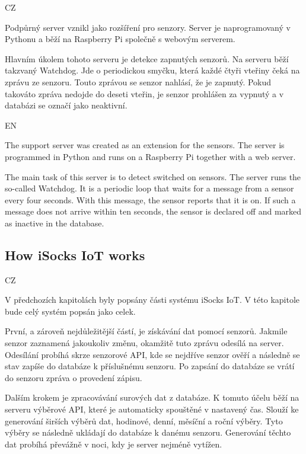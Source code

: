 \documentclass[12pt, a4paper]{article}
\begin{document}
CZ

Podpůrný server vznikl jako rozšíření pro senzory.
Server je naprogramovaný v Pythonu a běží na Raspberry Pi společně s webovým serverem.\newline

Hlavním úkolem tohoto serveru je detekce zapnutých senzorů.
Na serveru běží takzvaný Watchdog.
Jde o periodickou smyčku, která každé čtyři vteřiny čeká na zprávu ze senzoru.
Touto zprávou se senzor nahlásí, že je zapnutý. Pokud takováto zpráva nedojde do deseti vteřin, je senzor prohlášen za vypnutý a v databázi se označí jako neaktivní.

EN

The support server was created as an extension for the sensors.
The server is programmed in Python and runs on a Raspberry Pi together with a web server.\newline

The main task of this server is to detect switched on sensors.
The server runs the so-called Watchdog.
It is a periodic loop that waits for a message from a sensor every four seconds.
With this message, the sensor reports that it is on. If such a message does not arrive within ten seconds, the sensor is declared off and marked as inactive in the database.


\subsection*{How iSocks IoT works}

CZ

V předchozích kapitolách byly popsány části systému iSocks IoT.
V této kapitole bude celý systém popsán jako celek.

První, a zároveň nejdůležitější částí, je získávání dat pomocí senzorů.
Jakmile senzor zaznamená jakoukoliv změnu, okamžitě tuto zprávu odesílá na server.
Odesílání probíhá skrze senzorové API, kde se nejdříve senzor ověří a následně se stav zapíše do databáze k příslušnému senzoru.
Po zapsání do databáze se vrátí do senzoru zpráva o provedení zápisu.

Dalším krokem je zpracovávání surových dat z databáze.
K tomuto účelu běží na serveru výběrové API, které je automaticky spouštěné v nastavený čas.
Slouží ke generování širších výběrů dat, hodinové, denní, měsíční a roční výběry.
Tyto výběry se následně ukládají do databáze k danému senzoru.
Generování těchto dat probíhá převážně v noci, kdy je server nejméně vytížen.
\end{document}
